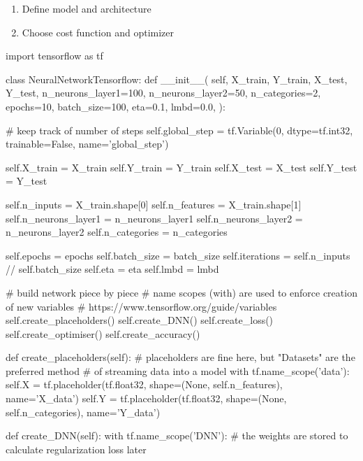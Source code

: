 \documentclass[%
oneside,                 %
final,                   %
10pt]{article}
\begin{document}
\begin{enumerate}
\item Define model and architecture

\item Choose cost function and optimizer
\end{enumerate}

\noindent
\bpycod
import tensorflow as tf

class NeuralNetworkTensorflow:
    def __init__(
        self,
        X_train,
        Y_train,
        X_test,
        Y_test,
        n_neurons_layer1=100,
        n_neurons_layer2=50,
        n_categories=2,
        epochs=10,
        batch_size=100,
        eta=0.1,
        lmbd=0.0,
    ):
        
        # keep track of number of steps
        self.global_step = tf.Variable(0, dtype=tf.int32, trainable=False, name='global_step')
        
        self.X_train = X_train
        self.Y_train = Y_train
        self.X_test = X_test
        self.Y_test = Y_test
        
        self.n_inputs = X_train.shape[0]
        self.n_features = X_train.shape[1]
        self.n_neurons_layer1 = n_neurons_layer1
        self.n_neurons_layer2 = n_neurons_layer2
        self.n_categories = n_categories
        
        self.epochs = epochs
        self.batch_size = batch_size
        self.iterations = self.n_inputs // self.batch_size
        self.eta = eta
        self.lmbd = lmbd
        
        # build network piece by piece
        # name scopes (with) are used to enforce creation of new variables
        # https://www.tensorflow.org/guide/variables
        self.create_placeholders()
        self.create_DNN()
        self.create_loss()
        self.create_optimiser()
        self.create_accuracy()
    
    def create_placeholders(self):
        # placeholders are fine here, but "Datasets" are the preferred method
        # of streaming data into a model
        with tf.name_scope('data'):
            self.X = tf.placeholder(tf.float32, shape=(None, self.n_features), name='X_data')
            self.Y = tf.placeholder(tf.float32, shape=(None, self.n_categories), name='Y_data')
    
    def create_DNN(self):
        with tf.name_scope('DNN'):
            # the weights are stored to calculate regularization loss later
            
\end{document}
